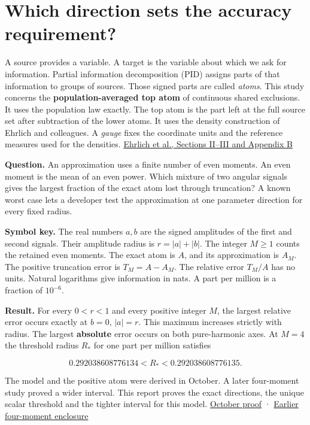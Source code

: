 \section{Which direction sets the accuracy requirement?}\label{which-direction-sets-the-accuracy-requirement}

A source provides a variable. A target is the variable about which we ask for information. Partial information decomposition (PID) assigns parts of that information to groups of sources. Those signed parts are called \emph{atoms}. This study concerns the \textbf{population-averaged top atom} of continuous shared exclusions. It uses the population law exactly. The top atom is the part left at the full source set after subtraction of the lower atoms. It uses the density construction of Ehrlich and colleagues. A \emph{gauge} fixes the coordinate units and the reference measures used for the densities. \href{https://arxiv.org/html/2311.06373v3}{Ehrlich et al., Sections II--III and Appendix B}

\textbf{Question.} An approximation uses a finite number of even moments. An even moment is the mean of an even power. Which mixture of two angular signals gives the largest fraction of the exact atom lost through truncation? A known worst case lets a developer test the approximation at one parameter direction for every fixed radius.

\textbf{Symbol key.} The real numbers \(a,b\) are the signed amplitudes of the first and second signals. Their amplitude radius is \(r=|a|+|b|\). The integer \(M\ge1\) counts the retained even moments. The exact atom is \(A\), and its approximation is \(A_M\). The positive truncation error is \(T_M=A-A_M\). The relative error \(T_M/A\) has no units. Natural logarithms give information in nats. A part per million is a fraction of \(10^{-6}\).

\textbf{Result.} For every \(0<r<1\) and every positive integer \(M\), the largest relative error occurs exactly at \(b=0\), \(|a|=r\). This maximum increases strictly with radius. The largest \textbf{absolute} error occurs on both pure-harmonic axes. At \(M=4\) the threshold radius \(R_*\) for one part per million satisfies

\[
0.292038608776134 < R_* < 0.292038608776135 .
\]

The model and the positive atom were derived in October. A later four-moment study proved a wider interval. This report proves the exact directions, the unique scalar threshold and the tighter interval for this model. \href{https://github.com/sepahead/pid-rs/blob/main/audit/archive/angular-relative-bound-20261005/derivation.md.txt}{October proof} · \href{https://github.com/sepahead/pid-rs/blob/main/audit/research/angular-four-moment-radius/EXPOSITION.md}{Earlier four-moment enclosure}

